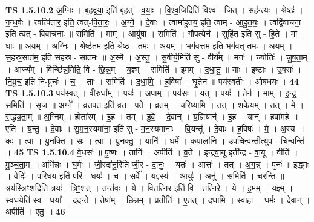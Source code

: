 \documentclass[17pt]{extarticle}
\begin{document}
                  \newline
                                \textbf{ TS 1.5.10.2} \newline
                  अ॒ग्निः । बृ॒हद्व॑या॒ इति॑ बृ॒हत् - व॒याः॒ । वि॒श्व॒जिदिति॑ विश्व - जित् । सह॑न्त्यः । श्रेष्ठः॑ । ग॒न्ध॒र्वः ॥ त्वत्पि॑तार॒ इति॒ त्वत्-पि॒ता॒रः॒ । अ॒ग्ने॒ । दे॒वाः । त्वामा॑हुतय॒ इति॒ त्वाम् - आ॒हु॒त॒यः॒ । त्वद्वि॑वाचना॒ इति॒ त्वत् - वि॒वा॒च॒नाः॒ ॥ समिति॑ । माम् । आयु॑षा । समिति॑ । गौ॒प॒त्येन॑ । सुहि॑त॒ इति॒ सु - हि॒ते॒ । मा॒ । धाः॒ ॥ अ॒यम् । अ॒ग्निः । श्रेष्ठ॑तम॒ इति॒ श्रेष्ठ॑ - त॒मः॒ । अ॒यम् । भग॑वत्तम॒ इति॒ भग॑वत्-त॒मः॒ । अ॒यम् । स॒ह॒स्र॒सात॑म॒ इति॑ सहस्र - सात॑मः ॥ अ॒स्मै । अ॒स्तु॒ । सु॒वीर्य॒मिति॑ सु - वीर्य᳚म् ॥ मनः॑ । ज्योतिः॑ । जु॒ष॒ता॒म् । आज्य᳚म् । विच्छि॑न्न॒मिति॒ वि - छि॒न्न॒म् । य॒ज्ञ्म् । समिति॑ । इ॒मम् । द॒धा॒तु॒ ॥ याः । इ॒ष्टाः । उ॒षसः॑ । नि॒म्रुच॒ इति॑ नि-म्रुचः॑ । च॒ । ताः । समिति॑ । द॒धा॒मि॒ । ह॒विषा᳚ । घृ॒तेन॑ ॥ पय॑स्वतीः । ओष॑धयः । \textbf{  44} \newline
                  \newline
                                \textbf{ TS 1.5.10.3} \newline
                  पय॑स्वत् । वी॒रुधा᳚म् । पयः॑ । अ॒पाम् । पय॑सः । यत् । पयः॑ ॥ तेन॑ । माम् । इ॒न्द्र॒ । समिति॑ । सृ॒ज॒ ॥ अग्ने᳚ । व्र॒त॒प॒त॒ इति॑ व्रत - प॒ते॒ । व्र॒तम् । च॒रि॒ष्या॒मि॒ । तत् । श॒के॒य॒म् । तत् । मे॒ । रा॒द्ध्य॒ता॒म् ॥ अ॒ग्निम् । होता॑रम् । इ॒ह । तम् । हु॒वे॒ । दे॒वान् । य॒ज्ञियान्॑ । इ॒ह । यान् । हवा॑महे ॥ एति॑ । य॒न्तु॒ । दे॒वाः । सु॒म॒न॒स्यमा॑ना॒ इति॑ सु - म॒न॒स्यमा॑नाः । वि॒यन्तु॑ । दे॒वाः । ह॒विषः॑ । मे॒ । अ॒स्य ॥ कः । त्वा॒ । यु॒न॒क्ति॒ । सः । त्वा॒ । यु॒न॒क्तु॒ । यानि॑ । घ॒र्मे । क॒पाला॑नि । उ॒प॒चि॒न्वन्तीत्यु॑प - चि॒न्वन्ति॑ । \textbf{  45} \newline
                  \newline
                                \textbf{ TS 1.5.10.4} \newline
                  वे॒धसः॑ ॥ पू॒ष्णः । तानि॑ । अपीति॑ । व्र॒ते । इ॒न्द्र॒वा॒यू इती᳚न्द्र - वा॒यू । वीति॑ । मु॒ञ्च॒ता॒म् ॥ अभि॑न्नः । घ॒र्मः । जी॒रदा॑नु॒रिति॑ जी॒र - दा॒नुः॒ । यतः॑ । आत्तः॑ । तत् । अ॒ग॒न्न् । पुनः॑ ॥ इ॒द्ध्मः । वेदिः॑ । प॒रि॒ध॒य॒ इति॑ परि - धयः॑ । च॒ । सर्वे᳚ । य॒ज्ञ्स्य॑ । आयुः॑ । अनु॑ । समिति॑ । च॒र॒न्ति॒ ॥ त्रय॑स्त्रिꣳश॒दिति॒ त्रयः॑ - त्रिꣳ॒॒श॒त् । तन्त॑वः । ये । वि॒त॒त्नि॒र इति॑ वि - त॒त्नि॒रे । ये । इ॒मम् । य॒ज्ञ्म् । स्व॒धयेति॑ स्व - धया᳚ । दद॑न्ते । तेषा᳚म् । छि॒न्नम् । प्रतीति॑ । ए॒तत् । द॒धा॒मि॒ । स्वाहा᳚ । घ॒र्मः । दे॒वान् । अपीति॑ । ए॒तु॒ ॥ \textbf{  46} \newline
\end{document}
